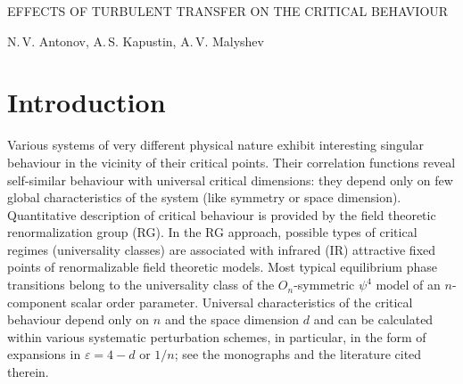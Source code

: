 \documentclass[12pt]{iopart}
\begin{document}

\centerline{EFFECTS OF TURBULENT TRANSFER ON THE CRITICAL BEHAVIOUR}

\centerline{N.\,V. Antonov, A.\,S. Kapustin, A.\,V. Malyshev}

\address{Department of Theoretical Physics, St.~Petersburg State University
\\  St.~Petersburg, Petrodvorez, 198504 Russia}


\begin{abstract}
Critical behaviour of two systems, subjected to the turbulent mixing,
is studied by means of the field theoretic renormalization group. The
first system, described by the equilibrium model {\it A}, corresponds
to relaxational dynamics of a non-conserved order parameter. The second
one is the strongly nonequilibrium reaction-diffusion system, known as
Gribov process or directed percolation process. The turbulent mixing is
modelled by the stochastic Navier-Stokes equation with random stirring
force with the correlator $\propto \delta(t-t') p^{4-d-y}$, where $p$
is the wave number, $d$ is the space dimension and $y$ the arbitrary
exponent. It is shown that, depending on the relation between $y$ and
$d$, the system exhibits various types of critical behaviour. In addition
to known regimes (original model without mixing and passively advected
scalar field), existence of new strongly nonequilibrium universality classes
is established, and the corresponding critical dimensions are calculated to
the first order of the double expansion in $y$ and $\varepsilon=4-d$
(one-loop approximation).
\end{abstract}



\section{Introduction} \label{sec:Intro}

Various systems of very different physical nature exhibit interesting
singular behaviour in the vicinity of their critical points. Their
correlation functions reveal self-similar behaviour with universal
critical dimensions: they depend only on few global characteristics
of the system (like symmetry or space dimension). Quantitative description
of critical behaviour is provided by the field theoretic renormalization
group (RG). In the
RG approach, possible types of critical regimes (universality classes) are
associated with infrared (IR) attractive fixed points of renormalizable field
theoretic models. Most typical equilibrium phase transitions belong to the
universality class of the $O_{n}$-symmetric $\psi^{4}$ model of an
$n$-component scalar order parameter. Universal characteristics of the
critical behaviour depend only on $n$ and the space dimension $d$ and can
be calculated within various systematic perturbation schemes, in particular,
in the form of expansions in $\varepsilon=4-d$ or $1/n$; see the monographs
\cite{Zinn,Book3} and the literature cited therein.
\end{document}

